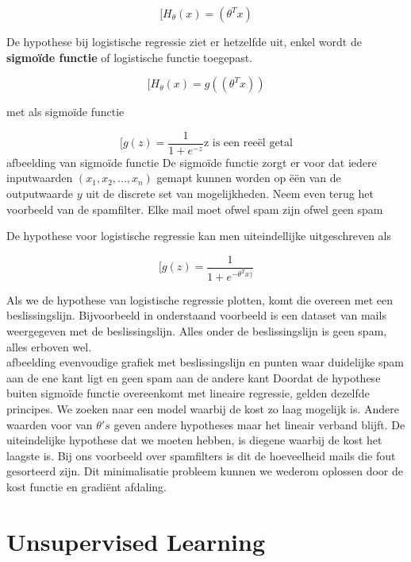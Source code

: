 \[ [H_{\theta}(x) = (\theta^{T}x)\]

De hypothese bij logistische regressie ziet er hetzelfde uit, enkel wordt de \textbf{sigmo\"ide functie} of logistische functie toegepast.

\[ [H_{\theta}(x) = g((\theta^{T}x))\]

met als sigmo\"ide functie

\[ [g(z) = \frac{1}{1 + e^{-z}}  \text{z is een ree\"el getal} \]
\newline
afbeelding van sigmo\"ide functie
\newline
De sigmo\"ide functie zorgt er voor dat iedere inputwaarden $(x_{1}, x_{2} , ... , x_{n})$ gemapt kunnen worden op \"e\"en van de outputwaarde $y$ uit de discrete set van mogelijkheden. Neem even terug het voorbeeld van de spamfilter. Elke mail moet ofwel spam zijn ofwel geen spam

De hypothese voor logistische regressie kan men uiteindellijke uitgeschreven als

\[ [g(z) = \frac{1}{1 + e^{-\theta^{T}x)}} \]

Als we de hypothese van logistische regressie plotten, komt die overeen met een beslissingslijn. Bijvoorbeeld in onderstaand voorbeeld is een dataset van mails weergegeven met de beslissingslijn. Alles onder de beslissingslijn is geen spam, alles erboven wel. \\
\newline
afbeelding evenvoudige grafiek met beslissingslijn en punten waar duidelijke spam aan de ene kant ligt en geen spam aan de andere kant
\newline
Doordat de hypothese buiten sigmo\"ide functie overeenkomt met lineaire regressie, gelden dezelfde principes. We zoeken naar een model waarbij de kost zo laag mogelijk is. Andere waarden voor van $\theta's$ geven andere hypotheses maar het lineair verband blijft. De uiteindelijke hypothese dat we moeten hebben, is diegene waarbij de kost het laagste is. Bij ons voorbeeld over spamfilters is dit de hoeveelheid mails die fout gesorteerd zijn. Dit minimalisatie probleem kunnen we wederom oplossen door de kost functie en gradi\"ent afdaling.

\section{Unsupervised Learning}\label{Unsupervised Learning}

